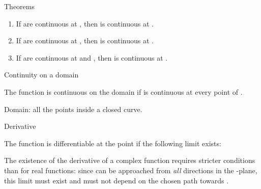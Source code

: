 \begin{EMtheorem}{Theorems}

\begin{enumerate}
\def\labelenumi{\arabic{enumi}.}
\tightlist
\item
  If  are continuous at , then  is continuous at .
\item
  If  are continuous at , then  is continuous at .
\item
  If  are continuous at  and , then  is continuous at .
\end{enumerate}

\end{EMtheorem}

\begin{EMdefinition}{Continuity on a domain}

The function  is continuous on the domain  if  is continuous at every point of .

Domain: all the points inside a closed curve.

\end{EMdefinition}


\EMhold


\begin{EMdefinition}{Derivative}

The function  is differentiable at the point  if the following limit exists:

\end{EMdefinition}

\begin{EMremark}{}

The existence of the derivative of a complex function requires stricter conditions than for real functions: since  can be approached from \emph{all} directions in the -plane, this limit must exist and must not depend on the chosen path towards .

\end{EMremark}


